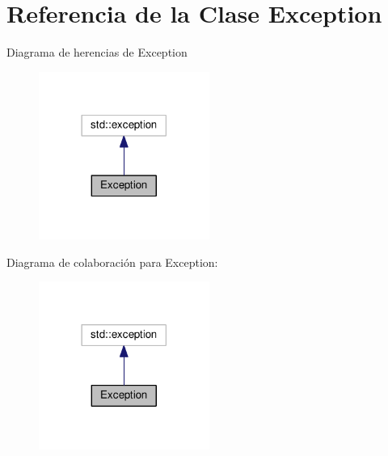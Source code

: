 \hypertarget{classException}{}\section{Referencia de la Clase Exception}
\label{classException}


Diagrama de herencias de Exception
\nopagebreak
\begin{figure}[H]
\begin{center}
\leavevmode
\includegraphics[width=158pt]{classException__inherit__graph}
\end{center}
\end{figure}


Diagrama de colaboración para Exception\+:
\nopagebreak
\begin{figure}[H]
\begin{center}
\leavevmode
\includegraphics[width=158pt]{classException__coll__graph}
\end{center}
\end{figure}
